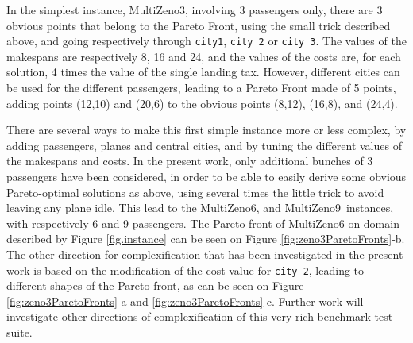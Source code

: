 \documentclass{llncs}
\def\MULTIZENO{{\sc MultiZeno}}
\begin{document}
In the simplest instance, \MULTIZENO3, involving 3 passengers only, there are 3 obvious points that belong to the Pareto Front, using the small trick described above, and going respectively through {\tt city1}, {\tt city 2} or {\tt city 3}. The values of the makespans are respectively 8, 16 and 24, and the values of the costs are, for each solution, 4 times the value of the single landing tax. However, different cities can be used for the different passengers, leading to a Pareto Front made of 5 points, adding points (12,10) and (20,6) to the obvious points (8,12), (16,8), and (24,4).

There are several ways to make this first simple instance more or less complex, by adding passengers, planes and central cities, and by tuning the different values of the makespans and costs. In the present work, only additional bunches of 3 passengers have been considered, in order to be able to easily derive some obvious Pareto-optimal solutions as above, using several times the little trick to avoid leaving any plane idle. This lead to the \MULTIZENO6, and  \MULTIZENO9\ instances, with respectively 6 and 9 passengers. The Pareto front of \MULTIZENO6 on domain described by Figure \ref{fig.instance} can be seen on Figure \ref{fig:zeno3ParetoFronts}-b. The other direction for complexification that has been investigated in the present work is based on the modification of the cost value for {\tt city 2}, leading to different shapes of the Pareto front, as can be seen on Figure \ref{fig:zeno3ParetoFronts}-a and \ref{fig:zeno3ParetoFronts}-c.
Further work will investigate other directions of complexification of this very rich benchmark test suite.

% 
%  
\end{document}
